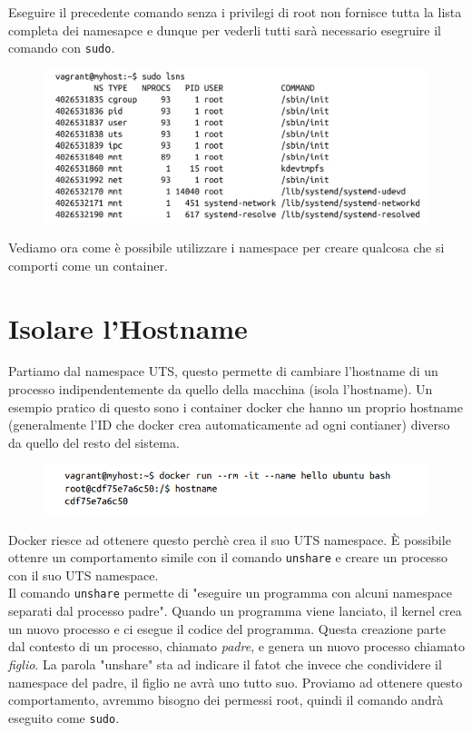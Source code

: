 Eseguire il precedente comando senza i privilegi di root non fornisce tutta la lista
completa dei namesapce e dunque per vederli tutti sarà necessario esegruire il comando
con \verb|sudo|.

\begin{figure}[H]
    \centering
    \includegraphics[width=\textwidth, keepaspectratio]{capitoli/os_security/imgs/namespace2.png}
\end{figure}

Vediamo ora come è possibile utilizzare i namespace per creare qualcosa che si
comporti come un container.

\section{Isolare l'Hostname}

Partiamo dal namespace UTS, questo permette di cambiare l'hostname di un processo
indipendentemente da quello della macchina (isola l'hostname).
Un esempio pratico di questo sono i container docker che hanno un proprio hostname
(generalmente l'ID che docker crea automaticamente ad ogni contianer) diverso da
quello del resto del sistema.

\begin{figure}[H]
    \centering
    \includegraphics[width=\textwidth, keepaspectratio]{capitoli/os_security/imgs/hostname1.png}
\end{figure}

Docker riesce ad ottenere questo perchè crea il suo UTS namespace.
È possibile ottenre un comportamento simile con il comando \verb|unshare| e creare
un processo con il suo UTS namespace.\\

Il comando \verb|unshare| permette di "eseguire un programma con alcuni namespace
separati dal processo padre". Quando un programma viene lanciato, il kernel crea un
nuovo processo e ci esegue il codice del programma. Questa creazione parte dal
contesto di un processo, chiamato \textit{padre}, e
genera un nuovo processo chiamato \textit{figlio}. La parola "unshare" sta ad indicare
il fatot che invece che condividere il namespace del padre, il figlio ne avrà uno tutto suo.
Proviamo ad ottenere questo comportamento, avremmo bisogno dei permessi root,
quindi il comando andrà eseguito come \verb|sudo|.

